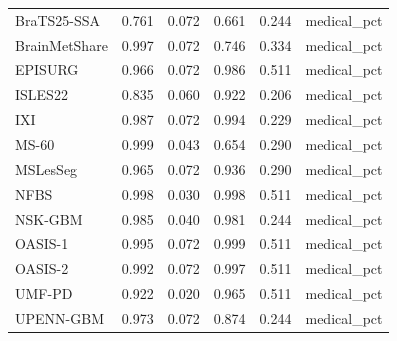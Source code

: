 \begin{tabular}{lrrrrl}
BraTS25-SSA & 0.761 & 0.072 & 0.661 & 0.244 & medical\_pct \\
BrainMetShare & 0.997 & 0.072 & 0.746 & 0.334 & medical\_pct \\
EPISURG & 0.966 & 0.072 & 0.986 & 0.511 & medical\_pct \\
ISLES22 & 0.835 & 0.060 & 0.922 & 0.206 & medical\_pct \\
IXI & 0.987 & 0.072 & 0.994 & 0.229 & medical\_pct \\
MS-60 & 0.999 & 0.043 & 0.654 & 0.290 & medical\_pct \\
MSLesSeg & 0.965 & 0.072 & 0.936 & 0.290 & medical\_pct \\
NFBS & 0.998 & 0.030 & 0.998 & 0.511 & medical\_pct \\
NSK-GBM & 0.985 & 0.040 & 0.981 & 0.244 & medical\_pct \\
OASIS-1 & 0.995 & 0.072 & 0.999 & 0.511 & medical\_pct \\
OASIS-2 & 0.992 & 0.072 & 0.997 & 0.511 & medical\_pct \\
UMF-PD & 0.922 & 0.020 & 0.965 & 0.511 & medical\_pct \\
UPENN-GBM & 0.973 & 0.072 & 0.874 & 0.244 & medical\_pct \\
\bottomrule
\end{tabular}
